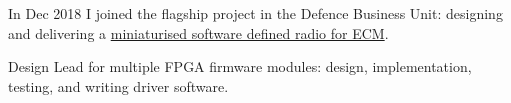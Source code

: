 In Dec 2018 I joined the flagship project in the Defence Business Unit: designing and delivering a
\href{https://roke.co.uk/innovations/protecting-personnel-from-ieds}{miniaturised software defined radio for ECM}.
\vspace{0.25em}
\begin{tightemize}
  \item Design Lead for multiple FPGA firmware modules: design, implementation, testing, and writing driver software.
\end{tightemize}
\sectionsep{}
